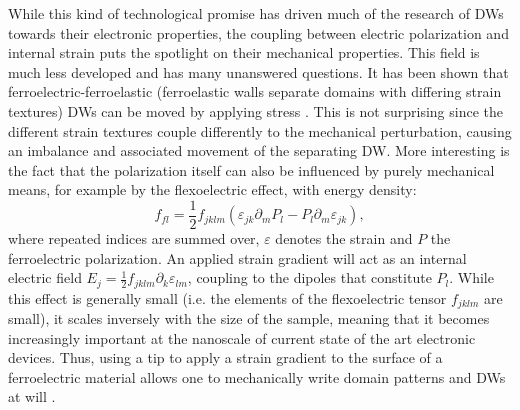 While this kind of technological promise has driven much of the research of DWs towards their electronic properties, the coupling between electric polarization and internal strain puts the spotlight on their mechanical properties.
This field is much less developed and has many unanswered questions. 
It has been shown that ferroelectric-ferroelastic (ferroelastic walls separate domains with differing strain textures) DWs can be moved by applying stress \cite{Schneider2001}. This is not surprising since the different strain textures couple differently to the mechanical perturbation, causing an imbalance and associated movement of the separating DW.
More interesting is the fact that the polarization itself can also be influenced by purely mechanical means, for example by the flexoelectric effect, with energy density:
\begin{equation}
f_{fl} = \frac{1}{2}f_{jklm}(\varepsilon_{jk}\partial_mP_l-P_l\partial_m\varepsilon_{jk}),
\end{equation}
where repeated indices are summed over, $\varepsilon$ denotes the strain and $P$ the ferroelectric polarization.
An applied strain gradient will act as an internal electric field $E_{j} = \frac{1}{2}f_{jklm}\partial_k\varepsilon_{lm}$, coupling to the dipoles that constitute $P_l$.
While this effect is generally small (i.e. the elements of the flexoelectric tensor $f_{jklm}$ are small), it scales inversely with the size of the sample, meaning that it becomes increasingly important at the nanoscale of current state of the art electronic devices.
Thus, using a tip to apply a strain gradient to the surface of a ferroelectric material allows one to mechanically write domain patterns and DWs at will \cite{Lu2012}.

